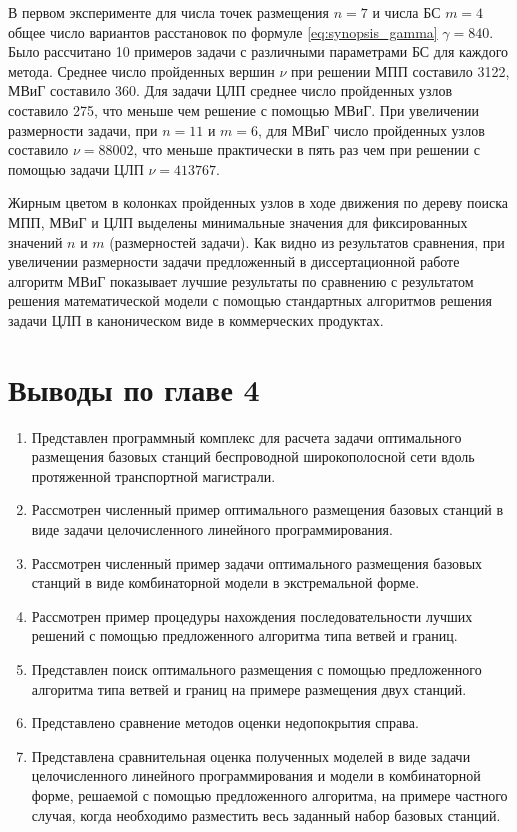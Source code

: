 В первом эксперименте для числа точек размещения $n=7$ и числа БС $m=4$ общее число вариантов расстановок по формуле \cref{eq:synopsis_gamma} $\gamma = 840$. Было рассчитано 10 примеров задачи с различными параметрами БС для каждого метода. Среднее число пройденных вершин $\nu$ при решении МПП составило 3122, МВиГ составило 360. Для задачи ЦЛП  среднее число пройденных узлов составило 275, что меньше чем решение с помощью МВиГ. При увеличении размерности задачи, при $n=11$ и $m=6$,  для МВиГ число пройденных узлов составило $\nu = 88002$, что меньше практически в пять раз чем при решении с помощью задачи ЦЛП $\nu=413767$.

Жирным цветом в колонках пройденных узлов в ходе движения по дереву поиска МПП, МВиГ и ЦЛП выделены минимальные значения для фиксированных значений $n$ и $m$ (размерностей задачи). Как видно из результатов сравнения, при увеличении размерности задачи предложенный в диссертационной работе алгоритм МВиГ показывает лучшие результаты по сравнению с результатом решения математической модели с помощью стандартных алгоритмов решения задачи ЦЛП в каноническом виде в коммерческих продуктах.

\FloatBarrier
\section{Выводы по главе 4}

\begin{enumerate}
  \item Представлен программный комплекс для расчета задачи оптимального размещения базовых станций беспроводной широкополосной сети вдоль протяженной транспортной магистрали.
  \item Рассмотрен численный пример оптимального размещения базовых станций в виде задачи целочисленного линейного программирования.
  \item Рассмотрен численный пример задачи оптимального размещения базовых станций  в виде комбинаторной модели в экстремальной форме.
  \item Рассмотрен пример процедуры нахождения последовательности лучших решений с помощью предложенного алгоритма типа ветвей и границ.
  \item Представлен поиск оптимального размещения с помощью предложенного алгоритма типа ветвей и границ на примере размещения двух станций.
  \item Представлено сравнение методов оценки недопокрытия справа.
  \item Представлена сравнительная оценка полученных моделей в виде задачи целочисленного линейного программирования и модели в комбинаторной форме, решаемой с помощью предложенного алгоритма, на примере частного случая, когда необходимо разместить весь заданный набор базовых станций.
\end{enumerate}
